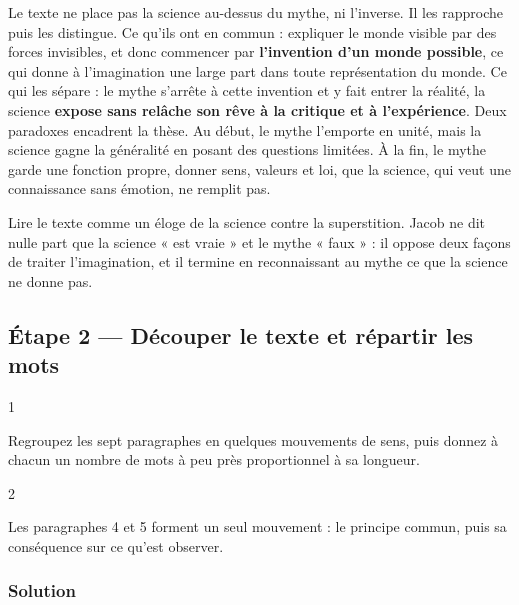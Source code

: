 \documentclass[11pt,a4paper]{article}
\begin{document}
Le texte ne place pas la science au-dessus du mythe, ni l'inverse. Il les rapproche puis les distingue. Ce qu'ils ont en commun : expliquer le monde visible par des forces invisibles, et donc commencer par \textbf{l'invention d'un monde possible}, ce qui donne à l'imagination une large part dans toute représentation du monde. Ce qui les sépare : le mythe s'arrête à cette invention et y fait entrer la réalité, la science \textbf{expose sans relâche son rêve à la critique et à l'expérience}. Deux paradoxes encadrent la thèse. Au début, le mythe l'emporte en unité, mais la science gagne la généralité en posant des questions limitées. À la fin, le mythe garde une fonction propre, donner sens, valeurs et loi, que la science, qui veut une connaissance sans émotion, ne remplit pas.

\begin{piege}

Lire le texte comme un éloge de la science contre la superstition. Jacob ne dit nulle part que la science « est vraie » et le mythe « faux » : il oppose deux façons de traiter l'imagination, et il termine en reconnaissant au mythe ce que la science ne donne pas.

\end{piege}

\hypertarget{uxe9tape-2-duxe9couper-le-texte-et-ruxe9partir-les-mots}{%
\subsection{Étape 2 --- Découper le texte et répartir les mots}\label{uxe9tape-2-duxe9couper-le-texte-et-ruxe9partir-les-mots}}

\begin{indication}{1}

Regroupez les sept paragraphes en quelques mouvements de sens, puis donnez à chacun un nombre de mots à peu près proportionnel à sa longueur.

\end{indication}

\begin{indication}{2}

Les paragraphes 4 et 5 forment un seul mouvement : le principe commun, puis sa conséquence sur ce qu'est observer.

\end{indication}

\hypertarget{solution-1}{%
\subsubsection{Solution}\label{solution-1}}
\end{document}
